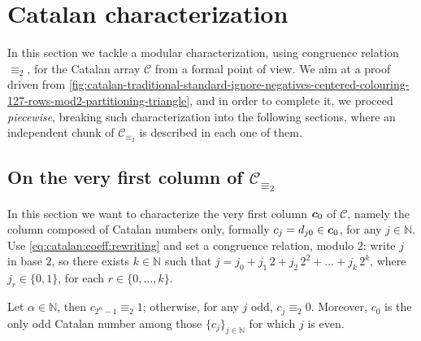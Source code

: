 
\section{Catalan characterization}
\label{sec:catalan:characterization}


In this section we tackle a modular characterization, using congruence relation
$\equiv_{2}$, for the Catalan array $\mathcal{C}$ from a formal point of view.
We aim at a proof driven from
\autoref{fig:catalan-traditional-standard-ignore-negatives-centered-colouring-127-rows-mod2-partitioning-triangle},
and in order to complete it, we proceed \emph{piecewise}, breaking such
characterization into the following sections, where an independent chunk of
$\mathcal{C}_{\equiv_{2}}$ is described in each one of them.


\subsection{On the very first column of $\mathcal{C}_{\equiv_{2}}$}


In this section we want to characterize the very first column $\boldsymbol{c}_{0}$
of $\mathcal{C}$, namely the column composed of Catalan numbers only,
formally $c_{j}=d_{j0}\in\boldsymbol{c}_{0}$, for any $j\in\mathbb{N}$.  
Use \autoref{eq:catalan:coeff:rewriting}
and set a congruence relation, modulo $2$: write $j$ in base $2$, 
so there exists $k\in\mathbb{N}$ such that 
$j=j_{0} + j_{1}\,2 + j_{2}\,2^{2} + \ldots + j_{k}\,2^{k}$, where
$j_{r}\in\lbrace0,1\rbrace$, for each $r\in\lbrace0,\ldots,k\rbrace$. 

\begin{theorem}
    Let $\alpha\in\mathbb{N}$, then $c_{2^{\alpha}-1} \equiv_{2} 1$; 
    otherwise, for any $j$ odd, $c_{j} \equiv_{2} 0$.
    Moreover, $c_{0}$ is the only odd Catalan number among those 
    $\lbrace c_{j}\rbrace_{j\in\mathbb{N}}$ for which $j$ is even.
\end{theorem}

